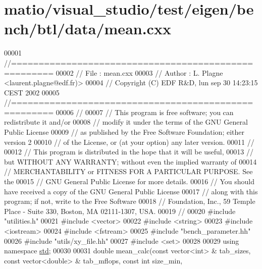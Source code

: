 \hypertarget{matio_2visual__studio_2test_2eigen_2bench_2btl_2data_2mean_8cxx_source}{}\section{matio/visual\+\_\+studio/test/eigen/bench/btl/data/mean.cxx}
\label{matio_2visual__studio_2test_2eigen_2bench_2btl_2data_2mean_8cxx_source}

\begin{DoxyCode}
00001 \textcolor{comment}{//=====================================================}
00002 \textcolor{comment}{// File   :  mean.cxx}
00003 \textcolor{comment}{// Author :  L. Plagne <laurent.plagne@edf.fr)>        }
00004 \textcolor{comment}{// Copyright (C) EDF R&D,  lun sep 30 14:23:15 CEST 2002}
00005 \textcolor{comment}{//=====================================================}
00006 \textcolor{comment}{// }
00007 \textcolor{comment}{// This program is free software; you can redistribute it and/or}
00008 \textcolor{comment}{// modify it under the terms of the GNU General Public License}
00009 \textcolor{comment}{// as published by the Free Software Foundation; either version 2}
00010 \textcolor{comment}{// of the License, or (at your option) any later version.}
00011 \textcolor{comment}{// }
00012 \textcolor{comment}{// This program is distributed in the hope that it will be useful,}
00013 \textcolor{comment}{// but WITHOUT ANY WARRANTY; without even the implied warranty of}
00014 \textcolor{comment}{// MERCHANTABILITY or FITNESS FOR A PARTICULAR PURPOSE.  See the}
00015 \textcolor{comment}{// GNU General Public License for more details.}
00016 \textcolor{comment}{// You should have received a copy of the GNU General Public License}
00017 \textcolor{comment}{// along with this program; if not, write to the Free Software}
00018 \textcolor{comment}{// Foundation, Inc., 59 Temple Place - Suite 330, Boston, MA  02111-1307, USA.}
00019 \textcolor{comment}{// }
00020 \textcolor{preprocessor}{#include "utilities.h"}
00021 \textcolor{preprocessor}{#include <vector>}
00022 \textcolor{preprocessor}{#include <string>}
00023 \textcolor{preprocessor}{#include <iostream>}
00024 \textcolor{preprocessor}{#include <fstream>}
00025 \textcolor{preprocessor}{#include "bench\_parameter.hh"}
00026 \textcolor{preprocessor}{#include "utils/xy\_file.hh"}
00027 \textcolor{preprocessor}{#include <set>}
00028 
00029 \textcolor{keyword}{using namespace }\hyperlink{namespacestd}{std};
00030 
00031 \textcolor{keywordtype}{double} mean\_calc(\textcolor{keyword}{const} vector<int> & tab\_sizes, \textcolor{keyword}{const} vector<double> & tab\_mflops, \textcolor{keyword}{const} \textcolor{keywordtype}{int} size\_min, \textcolor{keyword}{
}
\end{DoxyCode}
